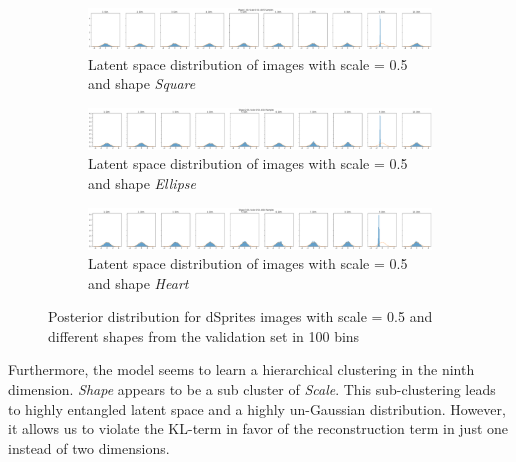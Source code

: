 \begin{figure}
    \centering
    \begin{subfigure}{\textwidth}
        \centering
        \includegraphics[width=\textwidth]{images/latent_space_entanglement/vae_dsprites_lf_10000_dist_shape_1_scale_0_5.png}
        \caption{Latent space distribution of images with scale = 0.5 and shape \textit{Square}}
    \end{subfigure}
    \begin{subfigure}{\textwidth}
        \centering
        \includegraphics[width=\textwidth]{images/latent_space_entanglement/vae_dsprites_lf_10000_dist_shape_2_scale_0_5.png}
        \caption{Latent space distribution of images with scale = 0.5 and shape \textit{Ellipse}}
    \end{subfigure}
    \begin{subfigure}{\textwidth}
        \centering
        \includegraphics[width=\textwidth]{images/latent_space_entanglement/vae_dsprites_lf_10000_dist_shape_3_scale_0_5.png}
        \caption{Latent space distribution of images with scale = 0.5 and shape \textit{Heart}}
    \end{subfigure}
    \caption[VAE Latent Space Distribution - dSprites Scale and Shapes]{Posterior distribution for dSprites images with scale = 0.5 and different shapes from the validation set in 100 bins}
    \label{fig:10000_vae_latent_space_distribution_scales_and_shapes}
\end{figure}

Furthermore, the model seems to learn a hierarchical clustering in the ninth dimension.
\textit{Shape} appears to be a sub cluster of \textit{Scale}.
This sub-clustering leads to highly entangled latent space and a highly un-Gaussian distribution.
However, it allows us to violate the \ac{KL}-term in favor of the reconstruction term in just one instead of two dimensions.

